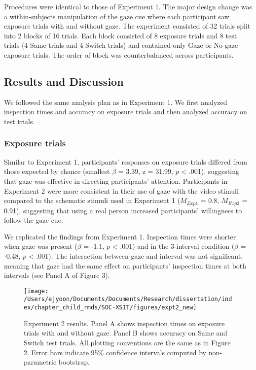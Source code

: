 \documentclass[oneside]{report}
\begin{document}
Procedures were identical to those of Experiment 1. The major design
change was a within-subjects manipulation of the gaze cue where each
participant saw exposure trials with and without gaze. The experiment
consisted of 32 trials split into 2 blocks of 16 trials. Each block
consisted of 8 exposure trials and 8 test trials (4 Same trials and 4
Switch trials) and contained only Gaze or No-gaze exposure trials. The
order of block was counterbalanced across participants.

\subsection{Results and Discussion}\label{results-and-discussion-1}

We followed the same analysis plan as in Experiment 1. We first analyzed
inspection times and accuracy on exposure trials and then analyzed
accuracy on test trials.

\subsubsection{Exposure trials}\label{exposure-trials-1}

Similar to Experiment 1, participants' responses on exposure trials
differed from those expected by chance (smallest \(\beta\) = 3.39, z =
31.99, \(p\) \textless{} .001), suggesting that gaze was effective in
directing participants' attention. Participants in Experiment 2 were
more consistent in their use of gaze with the video stimuli compared to
the schematic stimuli used in Experiment 1 (\(M_{Exp1}\) = 0.8,
\(M_{Exp2}\) = 0.91), suggesting that using a real person increased
participants' willingness to follow the gaze cue.

We replicated the findings from Experiment 1. Inspection times were
shorter when gaze was present (\(\beta\) = -1.1, \(p\) \textless{} .001)
and in the 3-interval condition (\(\beta\) = -0.48, \(p\) \textless{}
.001). The interaction between gaze and interval was not significant,
meaning that gaze had the same effect on participants' inspection times
at both intervals (see Panel A of Figure 3).
\begin{figure}[!t]

{\centering \texttt{[image: /Users/ejyoon/Documents/Documents/Research/dissertation/index/chapter\_child\_rmds/SOC-XSIT/figures/expt2\_new]} 

}

\caption[Experiment 4.2 results]{Experiment 2 results. Panel A shows inspection times on exposure trials with and without gaze. Panel B shows accuracy on Same and Switch test trials. All plotting conventions are the same as in Figure 2. Error bars indicate 95\% confidence intervals computed by non-parametric bootstrap.}\label{fig:expt2-plot}
\end{figure}
\end{document}
